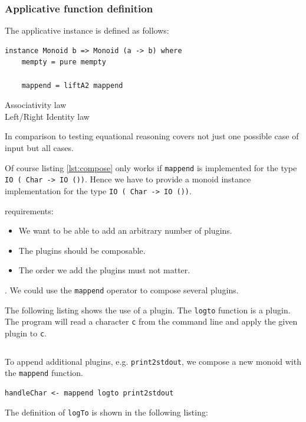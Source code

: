 \subsubsection{Applicative function definition}
 The applicative instance is defined as follows:
\begin{verbatim}
instance Monoid b => Monoid (a -> b) where
    mempty = pure mempty

    mappend = liftA2 mappend
\end{verbatim}

\begin{description}
\item[Associativity law] 
\item[Left/Right Identity law] 
\end{description}

In comparison to testing equational reasoning covers not just one possible case of input but all cases.


Of course listing \ref{lst:compose} only works if \verb|mappend| is implemented for the type \verb|IO ( Char -> IO ())|. Hence we have to provide a monoid instance implementation for the type \verb|IO ( Char -> IO ())|.



 requirements:
\begin{itemize}
\item We want to be able to add an arbitrary number of plugins.
\item The plugins should be composable.
\item The order we add the plugins must not matter.
\end{itemize}

. We could use the \verb|mappend| operator to compose several plugins. 

The following listing shows the use of a plugin. The \verb|logto| function is a plugin. The program will read a character \verb|c| from the command line and apply the given plugin to \verb|c|.

\begin{lstlisting}

\end{lstlisting}

To append additional plugins, e.g. \verb|print2stdout|, we compose a new monoid with the \verb|mappend| function.
\begin{verbatim}
handleChar <- mappend logto print2stdout
\end{verbatim}
The definition of \verb|logTo| is shown in the following listing: 

